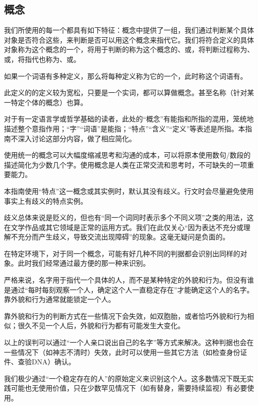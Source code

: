 \subsection{概念}
我们所使用的每一个都具有如下特征：概念中提供了一组，我们通过判断某个具体对象是否符合这些，来判断是否可以用这个概念来指代它。我们将符合定义的具体对象称为这个概念的一个，将用于判断的称为这个概念的、或，将判断过程称为、或，将指代也称为、或。

如果一个词语有多种定义，那么将每种定义称为它的一个，此时称这个词语有。
\begin{explain}
此定义的的定义较为宽松，只要是一个实词，都可以算做概念。甚至名称（针对某一特定个体的概念）也算。

对于有一定语言学或哲学基础的读者，此处的“概念”有能指和所指的混用，笼统地描述整个意指作用；“字”“词语”是能指；“特点”“含义”“定义”等表述是所指。本指南不深入讨论这部分内容，做了相应简化。

使用统一的概念可以大幅度缩减思考和沟通的成本，可以将原本使用数句/数段的描述简化为少数几个字。使用概念是人类在正常交流和思考时，不可缺失的一项重要能力。

本指南使用“特点”这一概念或其实例时，默认其没有歧义。行文时会尽量避免使用事实上有歧义的特点实例。

歧义总体来说是贬义的，但也有“同一个词同时表示多个不同义项”之类的用法，这在文学作品或其它领域是正常的运用方式。我们在此仅关心“因为表达不充分或理解不充分而产生歧义，导致交流出现障碍”的现象。这毫无疑问是负面的。
\end{explain}
在特定环境下，对于同一个概念，可能有好几种不同的判据都会识别出同样的对象。此时我们经常通过最方便的那一种来识别。
\begin{examples}
严格来说，名字用于指代一个具体的人，而不是某种特定的外貌和行为。但没有谁是通过“每时每刻观察一个人，确定这个人一直稳定存在”才能确定这个人的名字。靠外貌和行为通常就能锁定一个人。

靠外貌和行为的判断方式在一些情况下会失效，如双胞胎，或者恰巧外貌和行为相似；很久不见一个人后，外貌和行为都有可能发生大变化。

以上的误判可以通过“一个人亲口说出自己的名字”等方式来解决。这种判据也会在一些情况下（如神志不清时）失效，此时可以使用一些其它方法（如检查身份证件、查验DNA）确认。

我们极少通过“一个稳定存在的人”的原始定义来识别这个人。这多数情况下既无实践可能也无使用价值，只在少数罕见情况下（如有替身，需要持续监视）有必要使用。
\end{examples}
